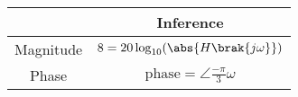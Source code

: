 
    \begin{tabular}{|c|c|}
        \hline
         & Inference \\
        \hline
        Magnitude & $8 = 20\log_{10}(\abs{{H}\brak{j\omega}})$ \\
        \hline
        Phase & $\text{phase} = \angle\frac{-\pi}{3}\omega$\\
        \hline
    \end{tabular}
    
